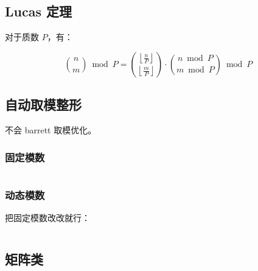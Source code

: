 \inputminted[mathescape]{cpp}{icpc/math/gcd/fast_gcd.cpp}

\subsection{Lucas 定理}

对于质数 $P$，有：

\[
\binom{n}{m}\bmod P =
\binom{\left\lfloor\frac{n}{P}\right\rfloor}{\left\lfloor\frac{m}{P}\right\rfloor}
\cdot \binom{n\bmod P}{m\bmod P}\bmod P
\]

\subsection{自动取模整形}

不会 barrett 取模优化。

\subsubsection{固定模数}

\inputminted{cpp}{icpc/math/modint/static_modint.cpp}

\subsubsection{动态模数}

把固定模数改改就行：

\inputminted{diff}{icpc/math/modint/diff}

\subsection{矩阵类}

\inputminted{cpp}{icpc/math/matrix/matrix.cpp}

